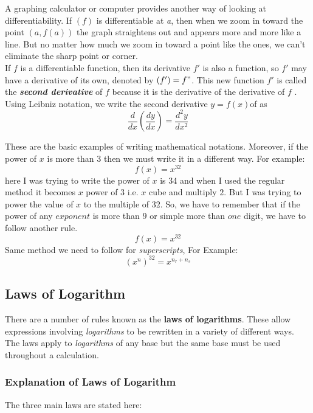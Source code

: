 \documentclass[12pt, a4paper]{article}
\begin{document}
\begin{multicols}{3}
\noindent
A graphing calculator or computer provides another way of looking at differentiability.
If $(f)$ is differentiable at \emph{a}, then when we zoom in toward the point $(a, f(a))$ the graph straightens out and appears more and more like a line. But no matter how much we zoom in toward a point like the ones, we can’t eliminate the sharp point or corner.\\
If $f$ is a differentiable function, then its derivative $f'$ is also a function, so ${f'}$ may have a derivative of its own, denoted by $(f') = f"$. This new function $f'$ is called the \textbf{\textit{second derivative}} of $f$ because it is the derivative of the derivative of $f$ . Using Leibniz notation, we write the second derivative $y = f(x) $of as $$\frac{d}{dx} (\frac{dy}{dx})=\frac{d^2y}{dx^2}$$
 
\end{multicols}
\noindent
These are the basic examples of writing mathematical notations. Moreover, if the power of $x$ is more than 3 then we must write it in a different way. For example:
$$ f(x) = x^32 $$ here I was trying to write the power of $x$ is 34 and when I used the regular method it becomes $x$ power of 3 i.e. $x$ cube and multiply $2$. But I was trying to power the value of $x$ to the multiple of $32$. So, we have to remember that if the power of any $exponent$ is more than $9$ or simple more than $one$ digit, we have to follow another rule.
\[f(x) = x^{32}\]
Same method we need to follow for \emph{superscripts}, For Example: 
\[ (x^n)^{32} = x^{n_r+n_s}  \]


\subsection*{Laws of Logarithm }

There are a number of rules known as the \textbf{laws of logarithms}. These allow expressions involving \emph {logarithms} to be rewritten in a variety of different ways. The laws apply to \emph{logarithms}  of any base but the same base must be used throughout a calculation.

\subsubsection*{Explanation of Laws of Logarithm}
The three main laws are stated here:
\end{document}
